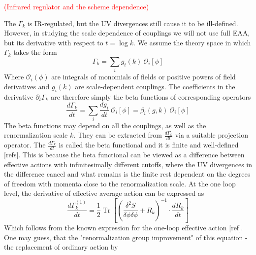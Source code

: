 \documentclass[11pt, a4paper]{article}
\begin{document}
\textcolor{red}{(Infrared regulator and the scheme dependence)}

The $\Gamma_k$ is IR-regulated, but the UV divergences still cause it to be ill-defined. 
However, in studying the scale dependence of couplings we will not use full EAA, 
but its derivative with respect to $t = \log{k}$.
We assume the theory space in which $\Gamma_k$ takes the form
\begin{equation}
    \Gamma_k = \sum_i g_i(k) \ \mathcal{O}_i [\phi]
    \label{gamma_decomp}
\end{equation}
Where $\mathcal{O}_i (\phi)$ are integrals of monomials of fields or positive powers of field derivatives 
and $g_i(k)$ are scale-dependent couplings.
The coefficients in the derivative $\partial_t \Gamma_k$ are therefore simply the beta functions of corresponding operators
\begin{equation}
    \frac{d \Gamma_k}{dt} = \sum_i \frac{d g_i}{dt} \ \mathcal{O}_i [\phi] = \beta_i(g,k) \ \mathcal{O}_i [\phi]
\end{equation}
The beta functions may depend on all the couplings, as well as the renormalization scale $k$.
They can be extracted from $\frac{d \Gamma_k}{dt}$ via a suitable projection operator. 
The $\frac{d \Gamma_k}{dt}$ is called the beta functional and it is finite and well-defined [refs].
This is because the beta functional can be viewed as a difference between effective actions with infinitesimally
different cutoffs, where the UV divergences in the difference cancel and what remains is the finite rest
dependent on the degrees of freedom with momenta close to the renormalization scale.
At the one loop level, the derivative of effective average action can be expressed as
\begin{equation}
    \frac{d \Gamma_k^{(1)}}{dt} = \frac{1}{2} \operatorname{Tr} \left[ \left(\frac{\delta^2 S}{\delta \phi \delta \phi} + R_k\right)^{-1} \cdot \frac{d R_k}{dt} \right]
\end{equation}
Which follows from the known expression for the one-loop effective action [ref].
One may guess, that the "renormalization group improvement" of this equation - the replacement of ordinary action by
\end{document}
